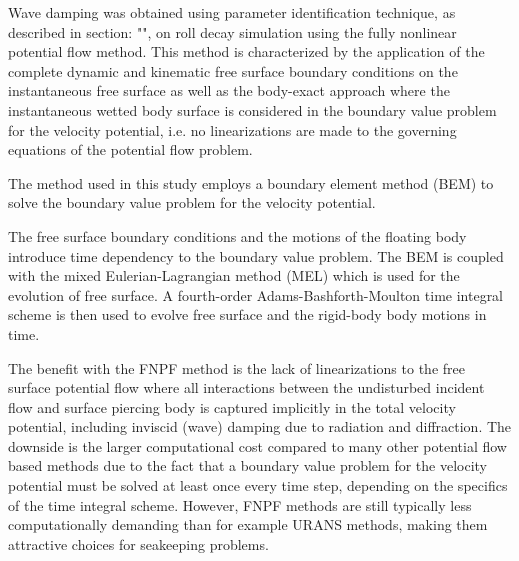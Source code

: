 \label{fnpf-method} Wave damping was obtained using parameter
identification technique, as described in section:
"", on roll decay simulation using the fully
nonlinear potential flow method. This method is characterized by the
application of the complete dynamic and kinematic free surface boundary
conditions on the instantaneous free surface as well as the body-exact
approach where the instantaneous wetted body surface is considered in
the boundary value problem for the velocity potential, i.e. no
linearizations are made to the governing equations of the potential flow
problem.

\quad The method used in this study employs a boundary element method
(BEM) \citep{7505983/FD4N3DW2} to solve the boundary value problem for
the velocity potential.

\quad The free surface boundary conditions and the motions of the
floating body introduce time dependency to the boundary value problem.
The BEM is coupled with the mixed Eulerian-Lagrangian method (MEL)
\citep{7505983/ZKB494GT} which is used for the evolution of free surface.
A fourth-order Adams-Bashforth-Moulton time integral scheme is then used
to evolve free surface and the rigid-body body motions in time.

\quad The benefit with the FNPF method is the lack of linearizations to
the free surface potential flow where all interactions between the
undisturbed incident flow and surface piercing body is captured
implicitly in the total velocity potential, including inviscid (wave)
damping due to radiation and diffraction. The downside is the larger
computational cost compared to many other potential flow based methods
due to the fact that a boundary value problem for the velocity potential
must be solved at least once every time step, depending on the specifics
of the time integral scheme. However, FNPF methods are still typically
less computationally demanding than for example URANS methods, making
them attractive choices for seakeeping problems.

    